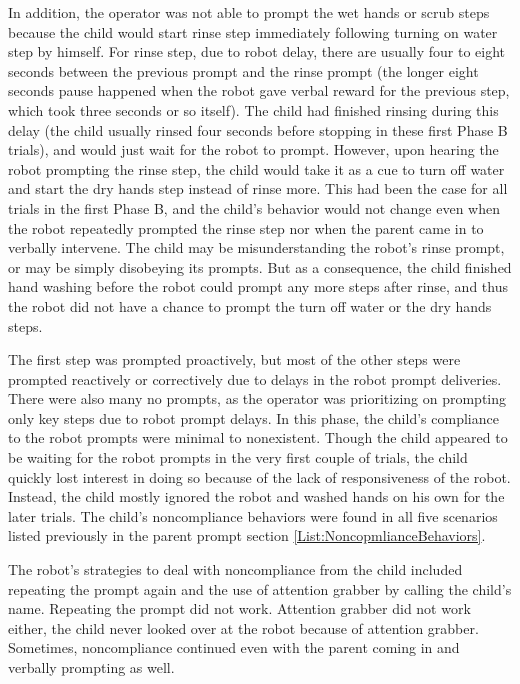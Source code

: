In addition, the operator was not able to prompt the wet hands or scrub steps because the child would start rinse step immediately following turning on water step by himself.  For rinse step, due to robot delay, there are usually four to eight seconds between the previous prompt and the rinse prompt (the longer eight seconds pause happened when the robot gave verbal reward for the previous step, which took three seconds or so itself).  The child had finished rinsing during this delay (the child usually rinsed four seconds before stopping in these first Phase B trials), and would just wait for the robot to prompt.  However, upon hearing the robot prompting the rinse step, the child would take it as a cue to turn off water and start the dry hands step instead of rinse more.  This had been the case for all trials in the first Phase B, and the child's behavior would not change even when the robot repeatedly prompted the rinse step nor when the parent came in to verbally intervene.  The child may be misunderstanding the robot's rinse prompt, or may be simply disobeying its prompts.  But as a consequence, the child finished hand washing before the robot could prompt any more steps after rinse, and thus the robot did not have a chance to prompt the turn off water or the dry hands steps.

The first step was prompted proactively, but most of the other steps were prompted reactively or correctively due to delays in the robot prompt deliveries.  There were also many no prompts, as the operator was prioritizing on prompting only key steps due to robot prompt delays.  In this phase, the child's compliance to the robot prompts were minimal to nonexistent.  Though the child appeared to be waiting for the robot prompts in the very first couple of trials, the child quickly lost interest in doing so because of the lack of responsiveness of the robot.  Instead, the child mostly ignored the robot and washed hands on his own for the later trials.  The child's noncompliance behaviors were found in all five scenarios listed previously in the parent prompt section \ref{List:NoncopmlianceBehaviors}.

The robot's strategies to deal with noncompliance from the child included repeating the prompt again and the use of attention grabber by calling the child's name.  Repeating the prompt did not work.  Attention grabber did not work either, the child never looked over at the robot because of attention grabber.  Sometimes, noncompliance continued even with the parent coming in and verbally prompting as well.

